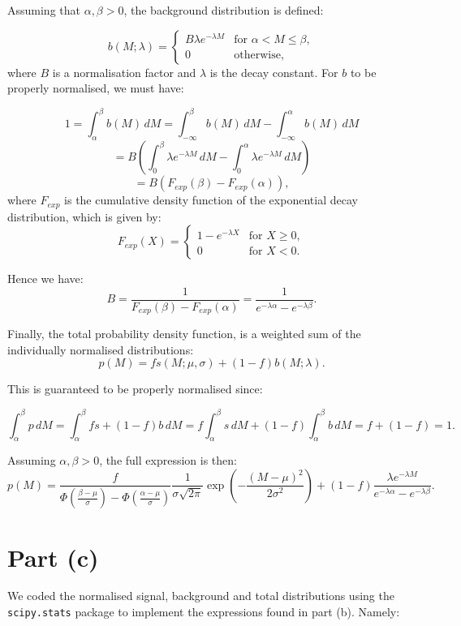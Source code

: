 \documentclass{article}
\begin{document}
Assuming that $\alpha, \beta > 0$, the background distribution is defined:

\[ 
b(M; \lambda) = 
\begin{cases} 
B\lambda e^{-\lambda M} & \text{for } \alpha < M \leq \beta, \\
0 & \text{otherwise},
\end{cases}
\]
where $B$ is a normalisation factor and $\lambda$ is the decay constant. For $b$ to be properly normalised, we must have:

\[
1 = \int_{\alpha}^{\beta} b(M) \, dM 
= 
\int_{-\infty}^{\beta} b(M) \, dM - \int_{-\infty}^{\alpha} b(M) \, dM
\]
\[
= B \left( 
\int_{0}^{\beta} \lambda e^{-\lambda M} \, dM - 
\int_{0}^{\alpha} \lambda e^{-\lambda M} \, dM
\right)
\]
\[
= B (F_{exp}(\beta) - F_{exp}(\alpha)),
\]
where $F_{exp}$ is the cumulative density function of the exponential decay distribution, which is given by:
\[
F_{exp}(X) = 
\begin{cases} 
1 - e^{-\lambda X} & \text{for } X \geq 0, \\
0 & \text{for } X < 0.
\end{cases}
\]

Hence we have:
\[
B = \frac{1}{F_{exp}(\beta) - F_{exp}(\alpha)} 
= \frac{1}{e^{-\lambda\alpha} - e^{-\lambda \beta}}.
\]

Finally, the total probability density function, is a weighted sum of the individually normalised distributions:
\[
p(M) = 
fs(M; \mu, \sigma) + (1-f)b(M; \lambda).
\]

This is guaranteed to be properly normalised since:

\[ 
\int_{\alpha}^{\beta} p \, dM = 
\int_{\alpha}^{\beta} fs + (1-f)b \, dM =
f\int_{\alpha}^{\beta} s \, dM + 
(1-f)\int_{\alpha}^{\beta} b \, dM
= f + (1-f) = 1.
\]

Assuming $\alpha, \beta > 0$, the full expression is then:
\[
p(M) = 
\frac{f}{\Phi(\frac{\beta-\mu}{\sigma}) - \Phi(\frac{\alpha-\mu}{\sigma})}
\frac{1}{\sigma\sqrt{2\pi}}
\exp\left(-\frac{(M - \mu)^2}{2\sigma^2}\right)
+
(1-f)
\frac{\lambda e^{-\lambda M}}
{e^{-\lambda\alpha} - e^{-\lambda\beta}}
.
\]

\section*{Part (c)}

We coded the normalised signal, background and total distributions using the \texttt{scipy.stats} package to implement the expressions found in part (b). Namely:
\end{document}
